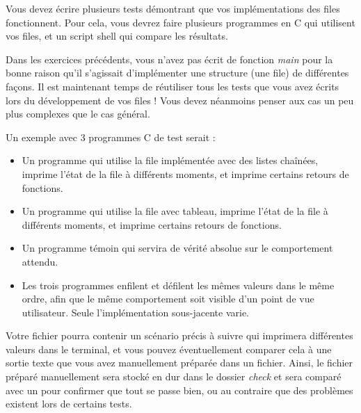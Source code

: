 

\vspace*{0.7cm}

\noindent {}

\bigskip

\noindent Vous devez écrire plusieurs tests démontrant que vos implémentations des files fonctionnent.
Pour cela, vous devrez faire plusieurs programmes en C qui utilisent vos files, et un script shell qui compare les résultats.

\noindent Dans les exercices précédents, vous n'avez pas écrit de fonction \textit{main} pour la bonne raison qu'il s'agissait d'implémenter une structure (une file) de différentes façons.
Il est maintenant temps de réutiliser tous les tests que vous avez écrits lors du développement de vos files !
Vous devez néanmoins penser aux cas un peu plus complexes que le cas général.

\bigskip

\noindent Un exemple avec 3 programmes C de test serait :
\begin{itemize}
\item Un programme qui utilise la file implémentée avec des listes chaînées, imprime l'état de la file à différents moments, et imprime certains retours de fonctions.
\item Un programme qui utilise la file avec tableau, imprime l'état de la file à différents moments, et imprime certains retours de fonctions.
\item Un programme témoin qui servira de vérité absolue sur le comportement attendu.
\item Les trois programmes enfilent et défilent les mêmes valeurs dans le même ordre, afin que le même comportement soit visible d'un point de vue utilisateur.
Seule l'implémentation sous-jacente varie.
\end{itemize}

\bigskip

\noindent Votre fichier  pourra contenir un scénario précis à suivre qui imprimera différentes valeurs dans le terminal, et vous pouvez éventuellement comparer cela à une sortie texte que vous avez manuellement préparée dans un fichier.
Ainsi, le fichier préparé manuellement sera stocké en dur dans le dossier \textit{check} et sera comparé avec un  pour confirmer que tout se passe bien, ou au contraire que des problèmes existent lors de certains tests.

